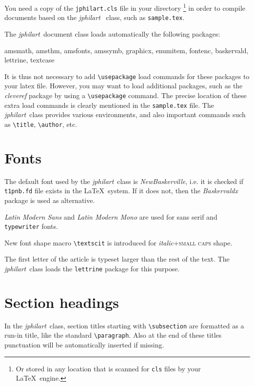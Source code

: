 \documentclass{jphilart}
\newcommand{\jphilart}{\emph{jphilart}\ } %
\begin{document}
You need a copy of the \texttt{jphilart.cls} file in your directory%
\footnote{Or stored in any location that is scanned for \texttt{cls} files by your
\LaTeX\ engine.} in order to compile documents based on the \jphilart
class, such as \texttt{sample.tex}.

The \jphilart document class loads automatically the following packages:
\begin{center}
  \ttfamily
  amsmath, amsthm, amsfonts, amssymb, graphicx, enumitem, fontenc,
  baskervald, lettrine, textcase
\end{center}
It is thus not necessary to add \verb+\usepackage+ load commands for
these packages to your latex file. However, you may want to load
additional packages, such as the \emph{cleveref} package by using a
\verb+\usepackage+ command. The precise location of these extra load
commands is clearly mentioned in the \texttt{sample.tex} file. The
\jphilart class provides various environments, and also important commands
such as \verb+\title+, \verb+\author+, etc.

\section{Fonts}

The default font used by the \jphilart class is \emph{NewBaskerville},
i.e. it is checked if \texttt{t1pnb.fd} file exists in the \LaTeX\ system.
If it does not, then the \emph{Baskervaldx} package is used as alternative.

\emph{Latin Modern Sans} and \emph{Latin Modern Mono} are used for
\textsf{sans serif} and \texttt{typewriter} fonts.\vfill\eject

New font shape macro \verb+\textscit+ is introduced for \emph{italic}+\textsc{small caps} shape.

The first letter of the article is typeset larger than the rest of the text.
The \jphilart class loads the \texttt{lettrine} package for this purpose.

\section{Section headings}

In the \jphilart class, section titles starting with \verb+\subsection+ are formatted as a
run-in title, like the standard \verb+\paragraph+. Also at the end of these
titles punctuation will be automatically inserted if missing.
\end{document}
